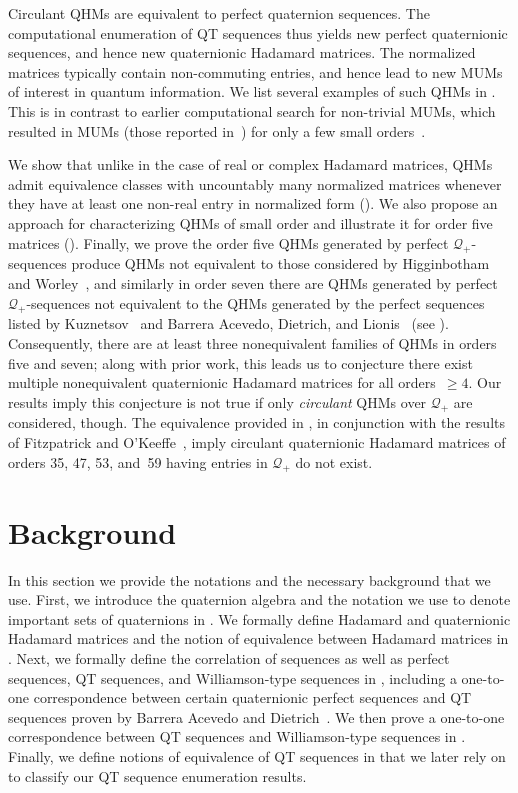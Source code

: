 \documentclass[12pt]{article}
\numberwithin{equation}{section}
\newcommand{\Q}{\mathcal{Q}}
\begin{document}
Circulant QHMs are equivalent to perfect quaternion sequences. The computational enumeration of QT sequences thus yields new perfect quaternionic sequences, and hence new quaternionic Hadamard matrices. The normalized matrices typically contain non-commuting entries, and hence lead to new MUMs of interest in quantum information. We list several examples of such QHMs in .
This is in contrast to earlier computational search for non-trivial MUMs, which resulted in MUMs (those reported in~\cite{TFR+21-mubs})
for only a few small orders~\cite{Farkas21}.

We show that unlike in the case of real or complex Hadamard matrices, QHMs admit equivalence classes with uncountably many normalized matrices whenever they have at least one non-real entry in normalized form ().
We also propose an approach for characterizing QHMs of small order and illustrate it for order five matrices ().
Finally, we prove the order five QHMs generated by perfect $\Q_+$-sequences produce QHMs not equivalent to those
considered by Higginbotham and Worley~\cite{Higginbotham2021}, and similarly in order seven there are QHMs generated
by perfect $\Q_+$-sequences not equivalent to the QHMs generated by the perfect sequences
listed by Kuznetsov~\cite{Kuznetsov2010} and Barrera Acevedo, Dietrich, and Lionis~\cite{BarreraAcevedo2024} (see ).
Consequently, there are at least three nonequivalent families of QHMs in orders five and seven;
along with prior work, this leads us to conjecture
there exist multiple nonequivalent quaternionic Hadamard matrices for all orders~$\ge 4$.
Our results imply this conjecture is not true if only \emph{circulant} QHMs over $\Q_+$ are considered, though.
The equivalence provided in , in conjunction with the results of Fitzpatrick
and O'Keeffe~\cite{Fitzpatrick2023}, imply circulant
quaternionic Hadamard matrices of orders
35, 47, 53, and~59 having entries in $\Q_+$ do not exist.

\section{Background}
\label{sec:prelims}

In this section we provide the notations and the necessary background that we use.
First, we introduce the quaternion algebra and the notation we use to denote important sets of quaternions in .
We formally define Hadamard and quaternionic Hadamard matrices
and the notion of equivalence between Hadamard matrices in .
Next, we formally define the correlation of sequences
as well as perfect sequences, QT sequences, and Williamson-type sequences in ,
including a one-to-one correspondence between certain quaternionic perfect sequences and QT sequences
proven by Barrera Acevedo and Dietrich~\cite{BAD18}.
We then prove a one-to-one correspondence between QT sequences and Williamson-type sequences in .
Finally, we define notions of equivalence of QT sequences in  that we later rely on to classify our QT sequence enumeration results.
\end{document}
